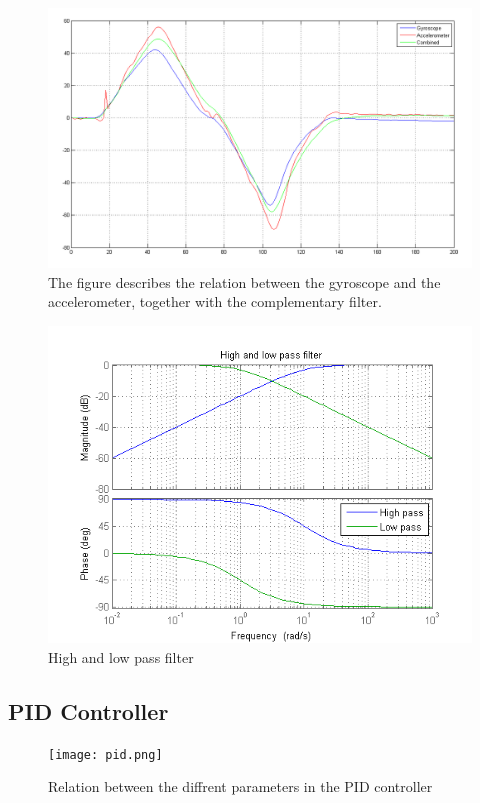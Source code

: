\documentclass[a4paper]{article}
\begin{document}
\begin{figure}[H]
 \centering
\includegraphics[scale=0.456]{pic/GyroAccCombAng.png}
\caption{The figure describes the relation between the gyroscope and the accelerometer, together with the complementary filter.}
\end{figure}

\begin{figure}[H]
  \centering
\includegraphics[scale=0.89]{pic/HP_LP.png}
\caption{High and low pass filter}
\end{figure}


\subsection{PID Controller}
\begin{figure}[H]
  \centering
\texttt{[image: pid.png]}
\caption{Relation between the diffrent parameters in the PID controller}
\end{figure}
\end{document}
